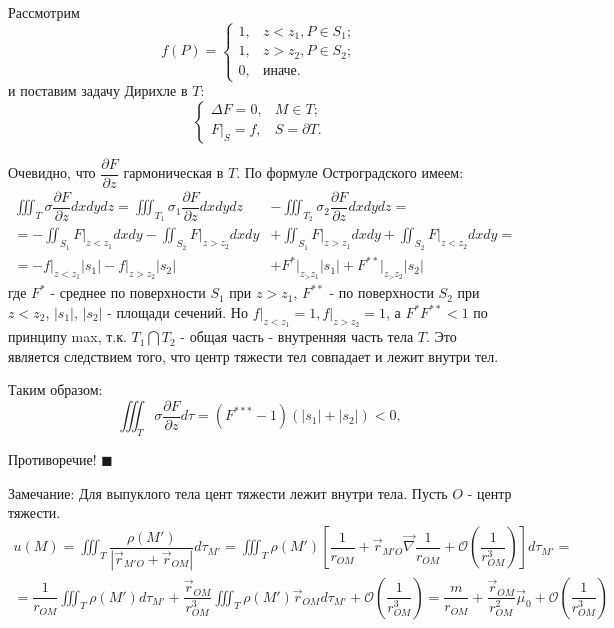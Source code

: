 \documentclass{article}
\begin{document}
Рассмотрим 
\[
f(P) = 
	\begin{cases}
	1, & z < z_1, P \in S_1;\\
	1, & z > z_2, P \in S_2;\\
	0, & \text{иначе}.
	\end{cases}
\]
и поставим задачу Дирихле в $T$:
\[
\begin{cases}
\Delta F = 0, & M \in T;\\
F \bigg|_S = f, & S = \partial T.
\end{cases}
\]

Очевидно, что $\dfrac{\partial F}{\partial z}$ гармоническая в $T$. По формуле Остроградского имеем:
\[
\begin{split}
\iiint_T \sigma \dfrac{\partial F}{\partial z} dx dy dz = 
\iiint_{T_1} \sigma_1 \dfrac{\partial F}{\partial z} dx dy dz &- 
\iiint_{T_2} \sigma_2 \dfrac{\partial F}{\partial z} dx dy dz=\\
= - \iint_{S_1} F \bigg|_{z<z_1} dx dy - \iint_{S_2} F \bigg|_{z>z_2} dx dy &+ \iint_{S_1} F \bigg|_{z>z_1} dx dy + \iint_{S_2} F \bigg|_{z<z_2} dx dy = \\
= -f \bigg|_{z<z_1}|s_1| - f \bigg|_{z > z_2} |s_2| &+ F^* \bigg|_{z_>z_1} |s_1| + F^{**} \bigg|_{z_>z_2} |s_2|
\end{split}
\]
где $F^*$ - среднее по поверхности $S_1$ при $z > z_1$, $F^{**}$ - по поверхности $S_2$ при $z <z_2$, $|s_1|$, $|s_2|$ - площади сечений. Но $f \bigg|_{z<z_1} = 1, f \bigg|_{z>z_2} = 1$, а $F^* F^{**} < 1$ по принципу max, т.к. $T_1 \bigcap T_2$ - общая часть - внутренняя часть тела $T$. Это является следствием того, что центр тяжести тел совпадает и лежит внутри тел.

Таким образом:
\[
\iiint_T \sigma \dfrac{\partial F}{\partial z} d \tau = (F^{***} -1)(|s_1| + |s_2|) < 0,
\]

Противоречие! $\blacksquare$
\vspace{0.5cm}


Замечание: Для выпуклого тела цент тяжести лежит внутри тела. Пусть $O$ - центр тяжести.
\[
\begin{split}
u(M) = \iiint_T \dfrac{\rho(M')}{| \overrightarrow{r}_{M'O} + \overrightarrow{r}_{OM} |} d \tau_{M'} = 
\iiint_T \rho(M') [ \dfrac{1}{r_{OM}} + \overrightarrow{r}_{M'O} \overrightarrow{\nabla} \dfrac{1}{r_{OM}} + \mathcal{O} (\dfrac{1}{r_{OM}^3})] d\tau_{M'} = \\
=\dfrac{1}{r_{OM}} \iiint_T \rho(M') d \tau_{M'} + \dfrac{\overrightarrow{r}_{OM}}{r_{OM}^3} \iiint_T \rho(M') \overrightarrow{r}_{OM} d \tau_{M'} + \mathcal{O} (\dfrac{1}{r_{OM}^3}) = 
\dfrac{m}{r_{OM}} + \dfrac{\overrightarrow{r}_{OM}}{r_{OM}^2} \overrightarrow{\mu}_0 + \mathcal{O} (\dfrac{1}{r_{OM}^3})
\end{split}
\]
\end{document}
